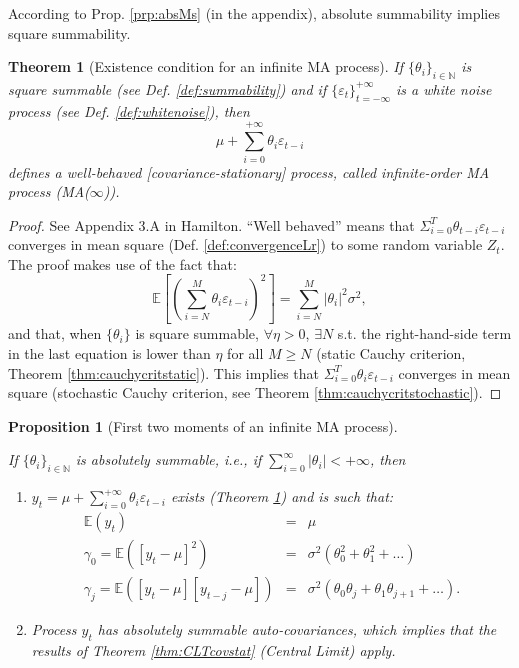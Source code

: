 \documentclass[
  11pt,
]{book}
\providecommand{\tightlist}{%
  \setlength{\itemsep}{0pt}\setlength{\parskip}{0pt}}
\newtheorem{theorem}{Theorem}[chapter]
\newtheorem{proposition}{Proposition}[chapter]
\theoremstyle{definition}
\theoremstyle{definition}
\theoremstyle{definition}
\theoremstyle{definition}
\theoremstyle{remark}
\begin{document}
According to Prop. \ref{prp:absMs} (in the appendix), absolute summability implies square summability.

\begin{theorem}[Existence condition for an infinite MA process]
\protect\hypertarget{thm:infMA}{}\label{thm:infMA}If \(\{\theta_{i}\}_{i\in\mathbb{N}}\) is square summable (see Def. \ref{def:summability}) and if \(\{\varepsilon_t\}_{t = -\infty}^{+\infty}\) is a white noise process (see Def. \ref{def:whitenoise}), then
\[
\mu + \sum_{i=0}^{+\infty} \theta_{i} \varepsilon_{t-i}
\]
defines a well-behaved {[}covariance-stationary{]} process, called infinite-order MA process (MA(\(\infty\))).
\end{theorem}

\begin{proof}
See Appendix 3.A in Hamilton. ``Well behaved'' means that \(\Sigma_{i=0}^{T} \theta_{t-i} \varepsilon_{t-i}\) converges in mean square (Def. \ref{def:convergenceLr}) to some random variable \(Z_t\). The proof makes use of the fact that:
\[
\mathbb{E}\left[\left(\sum_{i=N}^{M}\theta_{i} \varepsilon_{t-i}\right)^2\right] = \sum_{i=N}^{M}|\theta_{i}|^2 \sigma^2,
\]
and that, when \(\{\theta_{i}\}\) is square summable, \(\forall \eta>0\), \(\exists N\) s.t. the right-hand-side term in the last equation is lower than \(\eta\) for all \(M \ge N\) (static Cauchy criterion, Theorem \ref{thm:cauchycritstatic}). This implies that \(\Sigma_{i=0}^{T} \theta_{i} \varepsilon_{t-i}\) converges in mean square (stochastic Cauchy criterion, see Theorem \ref{thm:cauchycritstochastic}).
\end{proof}

\begin{proposition}[First two moments of an infinite MA process]
\protect\hypertarget{prp:momentsMAinf}{}\label{prp:momentsMAinf}

If \(\{\theta_{i}\}_{i\in\mathbb{N}}\) is absolutely summable, i.e., if \(\sum_{i=0}^{\infty}|\theta_i| < + \infty\), then

\begin{enumerate}
\def\labelenumi{\roman{enumi}.}
\tightlist
\item
  \(y_t = \mu + \sum_{i=0}^{+\infty} \theta_{i} \varepsilon_{t-i}\) exists (Theorem \ref{thm:infMA}) and is such that:
  \begin{eqnarray*}
  \mathbb{E}(y_t) &=& \mu\\
  \gamma_0 = \mathbb{E}([y_t-\mu]^2) &=& \sigma^2(\theta_0^2 +\theta_1^2 + \dots)\\
  \gamma_j = \mathbb{E}([y_t-\mu][y_{t-j}-\mu]) &=& \sigma^2(\theta_0\theta_j + \theta_{1}\theta_{j+1} + \dots).
  \end{eqnarray*}
\item
  Process \(y_t\) has absolutely summable auto-covariances, which implies that the results of Theorem \ref{thm:CLTcovstat} (Central Limit) apply.
\end{enumerate}

\end{proposition}
\end{document}
